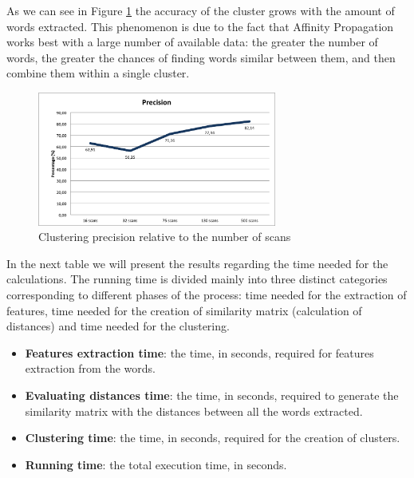 As we can see in Figure \ref{fig:precision} the accuracy of the cluster grows with the amount of words extracted. This phenomenon is due to the fact that Affinity Propagation works best with a large number of available data: the greater the number of words, the greater the chances of finding words similar between them, and then combine them within a single cluster.


\begin{figure}[!htbp]
\centering
\includegraphics[width=0.7\textwidth]{images/precisione.png}
\caption{Clustering precision relative to the number of scans}
\label{fig:precision}
\end{figure}

In the next table we will present the results regarding the time needed for the calculations. The running time is divided mainly into three distinct categories corresponding to different phases of the process: time needed for the extraction of features, time needed for the creation of similarity matrix (calculation of distances) and time needed for the clustering.

\begin{itemize}
\item \textbf{Features extraction time}: the time, in seconds, required for features extraction from the words.
\item \textbf{Evaluating distances time}: the time, in seconds, required to generate the similarity matrix with the distances between all the words extracted.
\item \textbf{Clustering time}: the time, in seconds, required for the creation of clusters.
\item \textbf{Running time}: the total execution time, in seconds.
\end{itemize}

